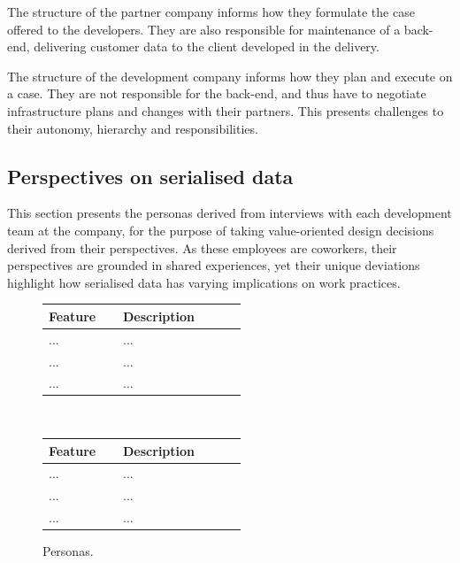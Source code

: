 \documentclass[../report.tex]{subfiles}
\begin{document}
The structure of the partner company informs how they formulate the case offered to the developers. They are also responsible for maintenance of a back-end, delivering customer data to the client developed in the delivery.

The structure of the development company informs how they plan and execute on a case. They are not responsible for the back-end, and thus have to negotiate infrastructure plans and changes with their partners. This presents challenges to their autonomy, hierarchy and responsibilities.

\subsection{Perspectives on serialised data}

This section presents the personas derived from interviews with each development team at the company, for the purpose of taking value-oriented design decisions derived from their perspectives. As these employees are coworkers, their perspectives are grounded in shared experiences, yet their unique deviations highlight how serialised data has varying implications on work practices.

\begin{figure}
\def\arraystretch{1.5}
\centering
\begin{tabular}{|p{0.3\linewidth}|p{0.5\linewidth}|}
\hline
Feature & Description \\
\hline
... & ... \\ 
... & ... \\ 
... & ... \\ 
\hline
\end{tabular}
\vspace{0.5cm} \\
\begin{tabular}{|p{0.3\linewidth}|p{0.5\linewidth}|}
\hline
Feature & Description \\
\hline
... & ... \\ 
... & ... \\ 
... & ... \\ 
\hline
\end{tabular}
\caption{Personas.}
\label{fig:personas}
\end{figure}
\end{document}
